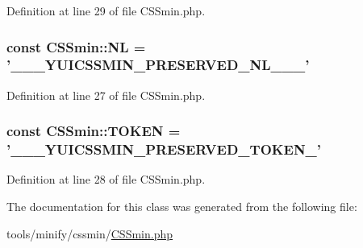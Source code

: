 Definition at line 29 of file C\+S\+Smin.\+php.

\hypertarget{classCSSmin_a55e6cef0883c8562b768a871128a7e27}{
\subsubsection[{N\+L}]{\setlength{\rightskip}{0pt plus 5cm}const C\+S\+Smin\+::\+N\+L = '\+\_\+\+\_\+\+\_\+\+Y\+U\+I\+C\+S\+S\+M\+I\+N\+\_\+\+P\+R\+E\+S\+E\+R\+V\+E\+D\+\_\+\+N\+L\+\_\+\+\_\+\+\_\+'}}\label{classCSSmin_a55e6cef0883c8562b768a871128a7e27}


Definition at line 27 of file C\+S\+Smin.\+php.

\hypertarget{classCSSmin_ae81aac5bd30611278b0f975aa38a7e50}{
\subsubsection[{T\+O\+K\+E\+N}]{\setlength{\rightskip}{0pt plus 5cm}const C\+S\+Smin\+::\+T\+O\+K\+E\+N = '\+\_\+\+\_\+\+\_\+\+Y\+U\+I\+C\+S\+S\+M\+I\+N\+\_\+\+P\+R\+E\+S\+E\+R\+V\+E\+D\+\_\+\+T\+O\+K\+E\+N\+\_\+'}}\label{classCSSmin_ae81aac5bd30611278b0f975aa38a7e50}


Definition at line 28 of file C\+S\+Smin.\+php.



The documentation for this class was generated from the following file\+:\begin{DoxyCompactItemize}
\item 
tools/minify/cssmin/\hyperlink{CSSmin_8php}{C\+S\+Smin.\+php}\end{DoxyCompactItemize}
